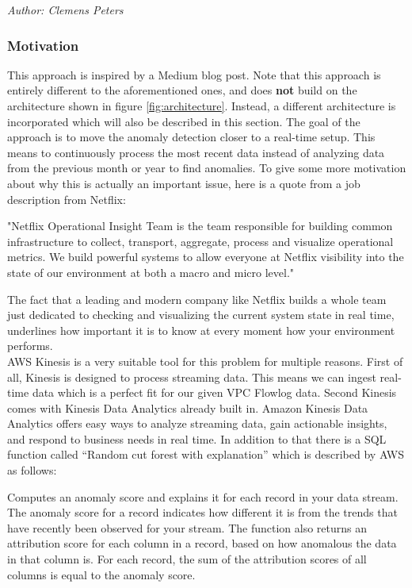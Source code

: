 \label{sec:real_time_anomaly_detection}
\textit{Author: Clemens Peters} \\
\subsubsection{Motivation}
This approach is inspired by a Medium blog post\cite{MEDIUM}.
Note that this approach is entirely different to the aforementioned ones, and does \textbf{not} build on the architecture shown in figure \ref{fig:architecture}. Instead, a different architecture is incorporated which will also be described in this section.
The goal of the approach is to move the anomaly detection closer to a real-time setup. This means to continuously process the most recent data instead of analyzing data from the previous month or year to find anomalies. To give some more motivation about why this is actually an important issue, here is a quote from a job description from Netflix\cite{NETFLIX}:
\begin{displayquote}
    "Netflix Operational Insight Team is the team responsible for building common infrastructure to collect, transport, aggregate, process and visualize operational metrics. We build powerful systems to allow everyone at Netflix visibility into the state of our environment at both a macro and micro level."
\end{displayquote}
The fact that a leading and modern company like Netflix builds a whole team just dedicated to checking and visualizing the current system state in real time, underlines how important it is to know at every moment how your environment performs.\\
AWS Kinesis is a very suitable tool for this problem for multiple reasons. First of all, Kinesis is designed to process streaming data. This means we can ingest real-time data which is a perfect fit for our given VPC Flowlog data. Second Kinesis comes with Kinesis Data Analytics already built in. Amazon Kinesis Data Analytics offers easy ways to analyze streaming data, gain actionable insights, and respond to business needs in real time. In addition to that there is a SQL function called “Random cut forest with explanation” which is described by AWS as follows:
\begin{displayquote}
    Computes an anomaly score and explains it for each record in your data stream. The anomaly score for a record indicates how different it is from the trends that have recently been observed for your stream. The function also returns an attribution score for each column in a record, based on how anomalous the data in that column is. For each record, the sum of the attribution scores of all columns is equal to the anomaly score. \cite{awsRcf}
\end{displayquote}

